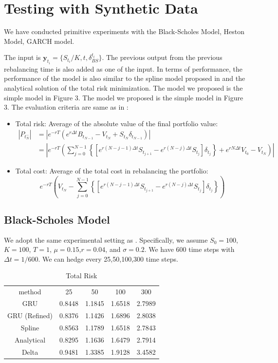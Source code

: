 \documentclass[letterpaper,12pt,titlepage,oneside,final]{book}
\numberwithin{equation}{section}
\theoremstyle{definition}
\newcommand{\vy}{\mathbf{y}}
\begin{document}
\section{Testing with Synthetic Data}

We have conducted primitive experiments with the Black-Scholes Model, Heston Model, GARCH model.

The input is $\vy_{t_i}=\{S_{t_i}/K,t,\delta_{BS}^{t_i}\}$. The previous output from the previous rebalancing time is also added as one of the input. In terms of performance, the performance of the model is also similar to the spline model proposed in \cite{coleman2007total} and the analytical solution of the total risk minimization. The model we proposed is the simple model in Figure 3.
The model we proposed is the simple model in Figure 3.
The evaluation criteria are same as in \cite{coleman2007total}:
\begin{itemize}
\item Total risk: Average of the absolute value of the final portfolio value:
\[ \begin{split}
|P_{t_N^-}|&=\left|e^{-r T}\left( e^{r \Delta t}B_{t_{N-1}}- V_{t_N}+ S_{t_N} \delta_{t_{N-1}} \right)\right| \\
&=\left|e^{-r T}\left(\sum_{j=0}^{N-1}\left\{ \left[e^{r (N-j-1) \Delta t} S_{t_{j+1}}-e^{r (N-j) \Delta t}S_{t_{j}}\right] \delta_{t_j} \right\}+e^{r N \Delta t} V_{t_0}-V_{t_N}\right)\right|
\end{split}
\]
\item Total cost: Average of the total cost in rebalancing the portfolio:
\[
e^{-r T}\left(V_{t_N}-\sum_{j=0}^{N-1}\left\{ \left[e^{r (N-j-1) \Delta t} S_{t_{j+1}}-e^{r (N-j) \Delta t}S_{t_{j}}\right] \delta_{t_j} \right\}\right)
\]
\end{itemize}

\subsection{Black-Scholes Model}
We adopt the same experimental setting as \cite{coleman2007total}. Specifically, we assume $S_0=100$,$K=100$, $T=1$, $\mu=0.15$,$r=0.04$, and $\sigma=0.2$.
We have 600 time steps with $\Delta t=1/600$. We can hedge every 25,50,100,300 time steps.
\begin{table}[htp!]
\centering
\begin{tabular}{|c|c|c|c|c|}
  \hline
  method       &25 &50&100&300 \\
  GRU          & 0.8448& 1.1845& 1.6518 & 2.7989 \\
  GRU (Refined)& 0.8376& 1.1426& 1.6896 & 2.8038 \\
  Spline       & 0.8563& 1.1789& 1.6518 & 2.7843 \\
  Analytical   & 0.8295& 1.1636& 1.6479 & 2.7914 \\
  Delta        & 0.9481&1.3385 & 1.9128 & 3.4582 \\
  \hline
\end{tabular}
\caption{Total Risk}
\end{table}
\end{document}
